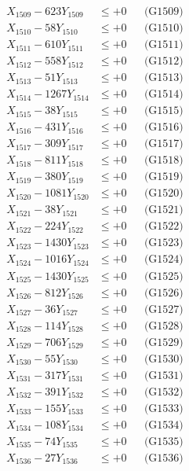 \documentclass[a4paper,10pt]{article}
\begin{document}
{\begin{align}
X_{1509} - 623Y_{1509} &\leq +0 && \text{(G1509)} \\
X_{1510} - 58Y_{1510} &\leq +0 && \text{(G1510)} \\
\allowbreak
X_{1511} - 610Y_{1511} &\leq +0 && \text{(G1511)} \\
X_{1512} - 558Y_{1512} &\leq +0 && \text{(G1512)} \\
X_{1513} - 51Y_{1513} &\leq +0 && \text{(G1513)} \\
X_{1514} - 1267Y_{1514} &\leq +0 && \text{(G1514)} \\
X_{1515} - 38Y_{1515} &\leq +0 && \text{(G1515)} \\
X_{1516} - 431Y_{1516} &\leq +0 && \text{(G1516)} \\
X_{1517} - 309Y_{1517} &\leq +0 && \text{(G1517)} \\
X_{1518} - 811Y_{1518} &\leq +0 && \text{(G1518)} \\
X_{1519} - 380Y_{1519} &\leq +0 && \text{(G1519)} \\
X_{1520} - 1081Y_{1520} &\leq +0 && \text{(G1520)} \\
\allowbreak
X_{1521} - 38Y_{1521} &\leq +0 && \text{(G1521)} \\
X_{1522} - 224Y_{1522} &\leq +0 && \text{(G1522)} \\
X_{1523} - 1430Y_{1523} &\leq +0 && \text{(G1523)} \\
X_{1524} - 1016Y_{1524} &\leq +0 && \text{(G1524)} \\
X_{1525} - 1430Y_{1525} &\leq +0 && \text{(G1525)} \\
X_{1526} - 812Y_{1526} &\leq +0 && \text{(G1526)} \\
X_{1527} - 36Y_{1527} &\leq +0 && \text{(G1527)} \\
X_{1528} - 114Y_{1528} &\leq +0 && \text{(G1528)} \\
X_{1529} - 706Y_{1529} &\leq +0 && \text{(G1529)} \\
X_{1530} - 55Y_{1530} &\leq +0 && \text{(G1530)} \\
\allowbreak
X_{1531} - 317Y_{1531} &\leq +0 && \text{(G1531)} \\
X_{1532} - 391Y_{1532} &\leq +0 && \text{(G1532)} \\
X_{1533} - 155Y_{1533} &\leq +0 && \text{(G1533)} \\
X_{1534} - 108Y_{1534} &\leq +0 && \text{(G1534)} \\
X_{1535} - 74Y_{1535} &\leq +0 && \text{(G1535)} \\
X_{1536} - 27Y_{1536} &\leq +0 && \text{(G1536)} \\

\end{align}}
\end{document}
